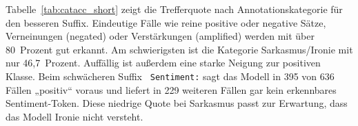 
Tabelle~\ref{tab:catacc_short} zeigt die Trefferquote nach Annotationskategorie für den besseren Suffix. Eindeutige Fälle wie reine positive oder negative Sätze, Verneinungen (negated) oder Verstärkungen (amplified) werden mit über 80~Prozent gut erkannt. Am schwierigsten ist die Kategorie Sarkasmus/Ironie mit nur 46,7~Prozent. Auffällig ist außerdem eine starke Neigung zur positiven Klasse. Beim schwächeren Suffix \texttt{ Sentiment:} sagt das Modell in 395 von 636 Fällen „positiv“ voraus und liefert in 229 weiteren Fällen gar kein erkennbares Sentiment-Token. Diese niedrige Quote bei Sarkasmus passt zur Erwartung, dass das Modell Ironie nicht versteht.
